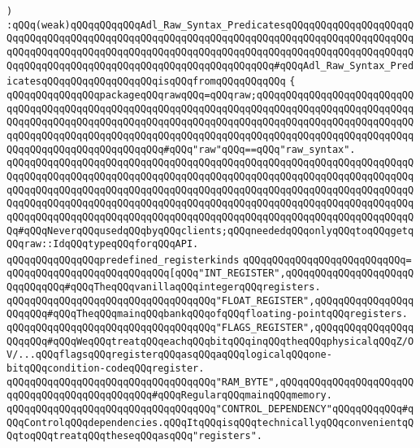\verb|)|\newline
\verb|:qQQq(weak)qQQqqQQqqQQqAdl_Raw_Syntax_PredicatesqQQqqQQqqQQqqQQqqQQqqQQqqQQqqQQqqQQqqQQqqQQqqQQqqQQqqQQqqQQqqQQqqQQqqQQqqQQqqQQqqQQqqQQqqQQqqQQqqQQqqQQqqQQqqQQqqQQqqQQqqQQqqQQqqQQqqQQqqQQqqQQqqQQqqQQqqQQqqQQqqQQqqQQqqQQqqQQqqQQqqQQqqQQqqQQqqQQqqQQqqQQqqQQq#qQQqAdl_Raw_Syntax_PredicatesqQQqqQQqqQQqqQQqqQQqisqQQqfromqQQqqQQqqQQq|\newline
\verb|{|\newline
\verb|qQQqqQQqqQQqqQQqpackageqQQqrawqQQq=qQQqraw;qQQqqQQqqQQqqQQqqQQqqQQqqQQqqQQqqQQqqQQqqQQqqQQqqQQqqQQqqQQqqQQqqQQqqQQqqQQqqQQqqQQqqQQqqQQqqQQqqQQqqQQqqQQqqQQqqQQqqQQqqQQqqQQqqQQqqQQqqQQqqQQqqQQqqQQqqQQqqQQqqQQqqQQqqQQqqQQqqQQqqQQqqQQqqQQqqQQqqQQqqQQqqQQqqQQqqQQqqQQqqQQqqQQqqQQqqQQqqQQqqQQqqQQqqQQqqQQqqQQqqQQq#qQQq"raw"qQQq==qQQq"raw_syntax".|\newline
\verb|qQQqqQQqqQQqqQQqqQQqqQQqqQQqqQQqqQQqqQQqqQQqqQQqqQQqqQQqqQQqqQQqqQQqqQQqqQQqqQQqqQQqqQQqqQQqqQQqqQQqqQQqqQQqqQQqqQQqqQQqqQQqqQQqqQQqqQQqqQQqqQQqqQQqqQQqqQQqqQQqqQQqqQQqqQQqqQQqqQQqqQQqqQQqqQQqqQQqqQQqqQQqqQQqqQQqqQQqqQQqqQQqqQQqqQQqqQQqqQQqqQQqqQQqqQQqqQQqqQQqqQQqqQQqqQQqqQQqqQQqqQQqqQQqqQQqqQQqqQQqqQQqqQQqqQQqqQQqqQQqqQQqqQQqqQQqqQQqqQQqqQQqqQQqqQQq#qQQqNeverqQQqusedqQQqbyqQQqclients;qQQqneededqQQqonlyqQQqtoqQQqgetqQQqraw::IdqQQqtypeqQQqforqQQqAPI.|\newline
\verb|qQQqqQQqqQQqqQQqpredefined_registerkinds|\newline
\verb|qQQqqQQqqQQqqQQqqQQqqQQqqQQq=|\newline
\verb|qQQqqQQqqQQqqQQqqQQqqQQqqQQq[qQQq"INT_REGISTER",qQQqqQQqqQQqqQQqqQQqqQQqqQQqqQQq#qQQqTheqQQqvanillaqQQqintegerqQQqregisters.|\newline
\verb|qQQqqQQqqQQqqQQqqQQqqQQqqQQqqQQqqQQq"FLOAT_REGISTER",qQQqqQQqqQQqqQQqqQQqqQQq#qQQqTheqQQqmainqQQqbankqQQqofqQQqfloating-pointqQQqregisters.|\newline
\verb|qQQqqQQqqQQqqQQqqQQqqQQqqQQqqQQqqQQq"FLAGS_REGISTER",qQQqqQQqqQQqqQQqqQQqqQQq#qQQqWeqQQqtreatqQQqeachqQQqbitqQQqinqQQqtheqQQqphysicalqQQqZ/OV/...qQQqflagsqQQqregisterqQQqasqQQqaqQQqlogicalqQQqone-bitqQQqcondition-codeqQQqregister.|\newline
\verb|qQQqqQQqqQQqqQQqqQQqqQQqqQQqqQQqqQQq"RAM_BYTE",qQQqqQQqqQQqqQQqqQQqqQQqqQQqqQQqqQQqqQQqqQQqqQQq#qQQqRegularqQQqmainqQQqmemory.|\newline
\verb|qQQqqQQqqQQqqQQqqQQqqQQqqQQqqQQqqQQq"CONTROL_DEPENDENCY"qQQqqQQqqQQq#qQQqControlqQQqdependencies.qQQqItqQQqisqQQqtechnicallyqQQqconvenientqQQqtoqQQqtreatqQQqtheseqQQqasqQQq"registers".|\newline
